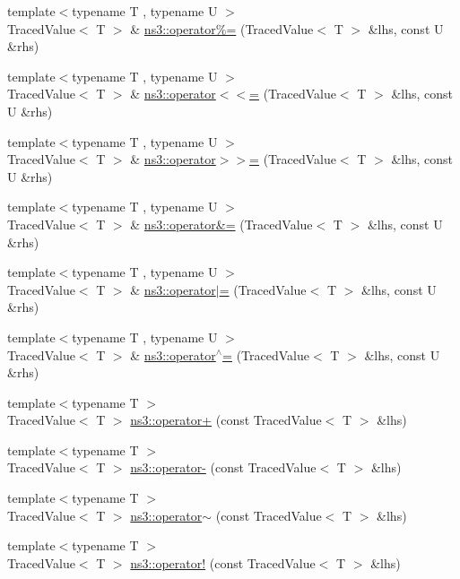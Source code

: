 \begin{DoxyCompactItemize}
\item 
{\footnotesize template$<$typename T , typename U $>$ }\\Traced\+Value$<$ T $>$ \& \hyperlink{group__tracing_ga250a8e4b206b847e622ef67954be4a3d}{ns3\+::operator\%=} (Traced\+Value$<$ T $>$ \&lhs, const U \&rhs)
\item 
{\footnotesize template$<$typename T , typename U $>$ }\\Traced\+Value$<$ T $>$ \& \hyperlink{group__tracing_ga49b9e5adeb4dde56be6d0b263473df36}{ns3\+::operator$<$$<$=} (Traced\+Value$<$ T $>$ \&lhs, const U \&rhs)
\item 
{\footnotesize template$<$typename T , typename U $>$ }\\Traced\+Value$<$ T $>$ \& \hyperlink{group__tracing_ga0cf4268a4b7e7eb82cff101a589a0f4a}{ns3\+::operator$>$$>$=} (Traced\+Value$<$ T $>$ \&lhs, const U \&rhs)
\item 
{\footnotesize template$<$typename T , typename U $>$ }\\Traced\+Value$<$ T $>$ \& \hyperlink{group__tracing_ga8c437708edb1885d6abae7de409537a6}{ns3\+::operator\&=} (Traced\+Value$<$ T $>$ \&lhs, const U \&rhs)
\item 
{\footnotesize template$<$typename T , typename U $>$ }\\Traced\+Value$<$ T $>$ \& \hyperlink{group__tracing_ga0ba583af9008fe12ad5e5dbc3876bd3a}{ns3\+::operator$\vert$=} (Traced\+Value$<$ T $>$ \&lhs, const U \&rhs)
\item 
{\footnotesize template$<$typename T , typename U $>$ }\\Traced\+Value$<$ T $>$ \& \hyperlink{group__tracing_ga1664e28fd027d3ea11ba08c901cd6233}{ns3\+::operator$^\wedge$=} (Traced\+Value$<$ T $>$ \&lhs, const U \&rhs)
\item 
{\footnotesize template$<$typename T $>$ }\\Traced\+Value$<$ T $>$ \hyperlink{group__tracing_gaaa79c0eebff3069a01a642b6b84fd5e4}{ns3\+::operator+} (const Traced\+Value$<$ T $>$ \&lhs)
\item 
{\footnotesize template$<$typename T $>$ }\\Traced\+Value$<$ T $>$ \hyperlink{group__tracing_ga38cdeb25463f71e678f5250e9e29f282}{ns3\+::operator-\/} (const Traced\+Value$<$ T $>$ \&lhs)
\item 
{\footnotesize template$<$typename T $>$ }\\Traced\+Value$<$ T $>$ \hyperlink{group__tracing_ga1ff2ce12f37dc6033808bb3530fd800e}{ns3\+::operator$\sim$} (const Traced\+Value$<$ T $>$ \&lhs)
\item 
{\footnotesize template$<$typename T $>$ }\\Traced\+Value$<$ T $>$ \hyperlink{group__tracing_ga550cfadaeb4fbbc8ff8f62d011555f07}{ns3\+::operator!} (const Traced\+Value$<$ T $>$ \&lhs)
\end{DoxyCompactItemize}


